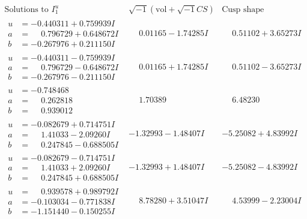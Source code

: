 \documentclass[1p]{elsarticle_modified}
\theoremstyle{definition}
\newcommand{\I}{\sqrt{-1}}
\begin{document}
$$\begin{array}{c|c|c}  
\text{Solutions to }I^u_{1}& \I (\text{vol} + \sqrt{-1}CS) & \text{Cusp shape}\\
 \hline 
\begin{aligned}
u &= -0.440311 + 0.759939 I \\
a &= \phantom{-}0.796729 + 0.648672 I \\
b &= -0.267976 + 0.211150 I\end{aligned}
 & \phantom{-}0.01165 - 1.74285 I & \phantom{-}0.51102 + 3.65273 I \\ \hline\begin{aligned}
u &= -0.440311 - 0.759939 I \\
a &= \phantom{-}0.796729 - 0.648672 I \\
b &= -0.267976 - 0.211150 I\end{aligned}
 & \phantom{-}0.01165 + 1.74285 I & \phantom{-}0.51102 - 3.65273 I \\ \hline\begin{aligned}
u &= -0.748468\phantom{ +0.000000I} \\
a &= \phantom{-}0.262818\phantom{ +0.000000I} \\
b &= \phantom{-}0.939012\phantom{ +0.000000I}\end{aligned}
 & \phantom{-}1.70389\phantom{ +0.000000I} & \phantom{-}6.48230\phantom{ +0.000000I} \\ \hline\begin{aligned}
u &= -0.082679 + 0.714751 I \\
a &= \phantom{-}1.41033 - 2.09260 I \\
b &= \phantom{-}0.247845 - 0.688505 I\end{aligned}
 & -1.32993 - 1.48407 I & -5.25082 + 4.83992 I \\ \hline\begin{aligned}
u &= -0.082679 - 0.714751 I \\
a &= \phantom{-}1.41033 + 2.09260 I \\
b &= \phantom{-}0.247845 + 0.688505 I\end{aligned}
 & -1.32993 + 1.48407 I & -5.25082 - 4.83992 I \\ \hline\begin{aligned}
u &= \phantom{-}0.939578 + 0.989792 I \\
a &= -0.103034 - 0.771838 I \\
b &= -1.151440 - 0.150255 I\end{aligned}
 & \phantom{-}8.78280 + 3.51047 I & \phantom{-}4.53999 - 2.23004 I \\ \hline\begin{aligned}

\end{aligned}
\end{array}$$
\end{document}
